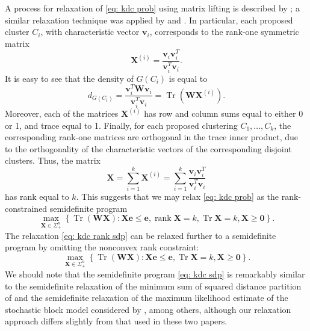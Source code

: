 \documentclass[twoside,11pt]{article}
\DeclareMathOperator{\rank}{{rank}}
\DeclareMathOperator{\tr}{{Tr}}
\newcommand{\e}{\bs {e}}
\newcommand{\bs}{\boldsymbol}
\renewcommand{\v}{\bs{v}}
\newcommand{\X}{\bs {X}}
\newcommand{\W}{\bs {W}}
\newcommand{\0}{\bs{0}}
\newcommand{\bra}[1]{\ensuremath{\left\{ #1 \right\}}} %
\begin{document}
{	%
	 A process for relaxation of \eqref{eq: kdc prob} using matrix lifting is described by \cite{ames2014guaranteed};
	a similar relaxation technique was applied by
	\cite{ames2011nuclear, ames2014convex}
	and \cite{ames2015guaranteed}.
	In particular, each proposed cluster \(C_i\), with characteristic vector \(\v_i\), corresponds to the rank-one symmetric matrix
	\[
	\X^{(i)} =  \frac{ \v_i \v_i^T}{ \v_i^T \v_i}.
	\]
	It is easy to see that the density of \(G(C_i)\) is equal to
	\[
	d_{G(C_i)}= \frac{ \v_i^T \W \v_i }{\v_i^T \v_i }  = \tr( \W \X^{(i)}) .
	\]
	Moreover, each of the matrices \(\X^{(i)}\) has row and column sums equal to either 0 or 1, and trace equal to 1.
	Finally,
	for each proposed clustering \(C_1, \dots, C_k\), the corresponding rank-one matrices are orthogonal in the trace inner 
	product, due to the orthogonality of the characteristic vectors of the corresponding disjoint clusters. 
	Thus, the matrix
	\begin{equation} \label{eq: cluster X}
	\X = \sum_{i=1}^k \X^{(i)} = \sum_{i=1}^k \frac{ \v_i \v_i^T}{ \v_i^T \v_i}
	\end{equation}
	has rank equal to \(k\).
	This suggests that we may relax \eqref{eq: kdc prob} as the rank-constrained semidefinite program
	\begin{equation} \label{eq: kdc rank sdp}
	\max_{\X \in \Sigma^n_+} \bra{ \tr(\W\X): \X \e \le \e, \rank \X = k, \tr \X = k, \X \ge \0 }.
	\end{equation}
	The relaxation \eqref{eq: kdc rank sdp} can be relaxed further to a semidefinite program
	by omitting the nonconvex rank constraint:
	\begin{equation} \label{eq: kdc sdp}
	\max_{\X \in \Sigma^n_+} \bra{ \tr(\W\X): \X \e \le \e, \tr \X = k, \X \ge \0}.
	\end{equation}
	We should note that the semidefinite program \eqref{eq: kdc sdp} is remarkably similar to the
	semidefinite relaxation of the minimum sum of squared distance partition of \cite{peng2007approximating}
	and the semidefinite relaxation of the maximum likelihood estimate of 
	the stochastic block model considered by \cite{amini2014semidefinite}, among others,
	although our relaxation approach differs slightly from that used in these two papers.

}
\end{document}
